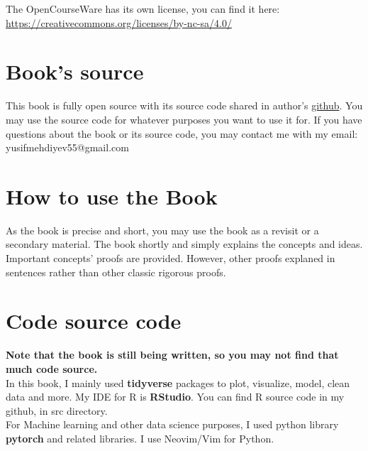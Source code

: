 The OpenCourseWare has its own license, you can find it here: \url{https://creativecommons.org/licenses/by-nc-sa/4.0/}


\section*{Book's source}
This book is fully open source with its source code shared in author's \href{https://github.com/JosephMehdiyev}{github}. You may use the source code for whatever purposes you want to use it for. If you have questions about the book or its source code, you may contact me with my email: yusifmehdiyev55@gmail.com 
\section*{How to use the Book}
As the book is precise and short, you may use the book as a revisit or a secondary material. The book shortly and simply explains the concepts and ideas. Important concepts' proofs are provided. However, other proofs explaned in sentences rather than other classic rigorous proofs.

\section*{Code source code}
\textbf{Note that the book is still being written, so you may not find that much code source.}\\
In this book, I mainly used \textbf{tidyverse} packages to plot, visualize, model, clean data and more. My IDE for R is \textbf{RStudio}. You can find R source code in my github, in src directory.
\\
For Machine learning and other data science purposes, I used python library \textbf{pytorch} and related libraries. I use Neovim/Vim for Python.
